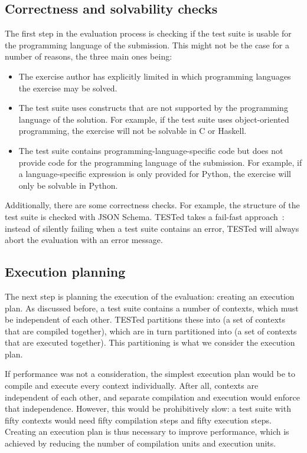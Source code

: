 \documentclass[../main]{subfiles}
\begin{document}
\subsection{Correctness and solvability checks}\label{subsec:solvability-and-correctness-checks}

The first step in the evaluation process is checking if the test suite is usable for the programming language of the submission.
This might not be the case for a number of reasons, the three main ones being:

\begin{itemize}
    \item The exercise author has explicitly limited in which programming languages the exercise may be solved.
    \item The test suite uses constructs that are not supported by the programming language of the solution.
          For example, if the test suite uses object-oriented programming, the exercise will not be solvable in C or Haskell.
    \item The test suite contains programming-language-specific code but does not provide code for the programming language of the submission.
          For example, if a language-specific expression is only provided for Python, the exercise will only be solvable in Python.
\end{itemize}

Additionally, there are some correctness checks.
For example, the structure of the test suite is checked with JSON Schema.
TESTed takes a fail-fast approach~\autocite{shoreFailFastSoftware2004}: instead of silently failing when a test suite contains an error, TESTed will always abort the evaluation with an error message.

\subsection{Execution planning}\label{subsec:execution-planning}

The next step is planning the execution of the evaluation: creating an execution plan.
As discussed before, a test suite contains a number of contexts, which must be independent of each other.
TESTed partitions these into  (a set of contexts that are compiled together), which are in turn partitioned into  (a set of contexts that are executed together).
This partitioning is what we consider the execution plan.

If performance was not a consideration, the simplest execution plan would be to compile and execute every context individually.
After all, contexts are independent of each other, and separate compilation and execution would enforce that independence.
However, this would be prohibitively slow: a test suite with fifty contexts would need fifty compilation steps and fifty execution steps.
Creating an execution plan is thus necessary to improve performance, which is achieved by reducing the number of compilation units and execution units.
\end{document}
